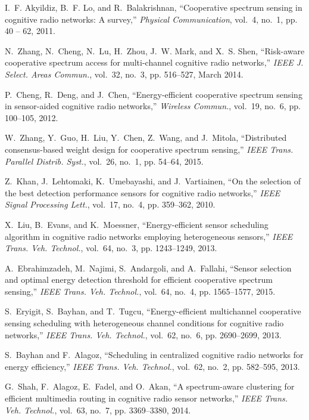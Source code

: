 \documentclass[journal]{IEEEtran} \ifCLASSINFOpdf
\begin{document}
\begin{thebibliography}{99}
I.~F. Akyildiz, B.~F. Lo, and R.~Balakrishnan, ``Cooperative spectrum sensing in cognitive radio networks: A survey,'' \emph{Physical Communication},  vol.~4, no.~1, pp. 40 -- 62, 2011.



N.~Zhang, N.~Cheng, N.~Lu, H.~Zhou, J.~W. Mark, and X.~S. Shen, ``Risk-aware
  cooperative spectrum access for multi-channel cognitive radio networks,''
  \emph{IEEE J. Select. Areas Commun.}, vol.~32, no.~3, pp. 516--527, March
  2014.

P.~Cheng, R.~Deng, and J.~Chen, ``Energy-efficient cooperative spectrum sensing
  in sensor-aided cognitive radio networks,'' \emph{Wireless Commun.}, vol.~19,
  no.~6, pp. 100--105, 2012.

W.~Zhang, Y.~Guo, H.~Liu, Y.~Chen, Z.~Wang, and J.~Mitola, ``Distributed
  consensus-based weight design for cooperative spectrum sensing,'' \emph{IEEE
  Trans. Parallel Distrib. Syst.}, vol.~26, no.~1, pp. 54--64, 2015.

Z.~Khan, J.~Lehtomaki, K.~Umebayashi, and J.~Vartiainen, ``On the selection of
  the best detection performance sensors for cognitive radio networks,''
  \emph{IEEE Signal Processing Lett.}, vol.~17, no.~4, pp. 359--362, 2010.

X.~Liu, B.~Evans, and K.~Moessner, ``Energy-efficient sensor scheduling
  algorithm in cognitive radio networks employing heterogeneous sensors,''
  \emph{IEEE Trans. Veh. Technol.}, vol.~64, no.~3, pp. 1243--1249, 2013.

A.~Ebrahimzadeh, M.~Najimi, S.~Andargoli, and A.~Fallahi, ``Sensor selection
  and optimal energy detection threshold for efficient cooperative spectrum
  sensing,'' \emph{IEEE Trans. Veh. Technol.}, vol.~64, no.~4, pp. 1565--1577,
  2015.

S.~Eryigit, S.~Bayhan, and T.~Tugcu, ``Energy-efficient multichannel
  cooperative sensing scheduling with heterogeneous channel conditions for
  cognitive radio networks,'' \emph{IEEE Trans. Veh. Technol.}, vol.~62, no.~6,
  pp. 2690--2699, 2013.

S.~Bayhan and F.~Alagoz, ``Scheduling in centralized cognitive radio networks
  for energy efficiency,'' \emph{IEEE Trans. Veh. Technol.}, vol.~62, no.~2,
  pp. 582--595, 2013.

G.~Shah, F.~Alagoz, E.~Fadel, and O.~Akan, ``A spectrum-aware clustering for
  efficient multimedia routing in cognitive radio sensor networks,'' \emph{IEEE
  Trans. Veh. Technol.}, vol.~63, no.~7, pp. 3369--3380, 2014.


\end{thebibliography}
\end{document}

